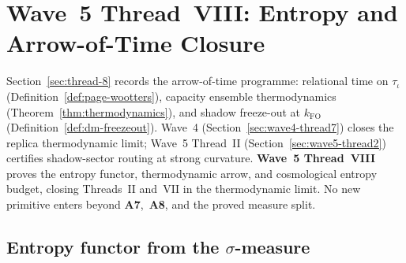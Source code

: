 \section{Wave~5 Thread~VIII: Entropy and Arrow-of-Time Closure}
\label{sec:wave5-thread8}

Section~\ref{sec:thread-8} records the arrow-of-time programme: relational time
on $\tau_\iota$ (Definition~\ref{def:page-wootters}), capacity ensemble
thermodynamics (Theorem~\ref{thm:thermodynamics}), and shadow freeze-out at
$k_{\mathrm{FO}}$ (Definition~\ref{def:dm-freezeout}). Wave~4
(Section~\ref{sec:wave4-thread7}) closes the replica thermodynamic limit;
Wave~5 Thread~II (Section~\ref{sec:wave5-thread2}) certifies shadow-sector
routing at strong curvature. \textbf{Wave~5 Thread~VIII} proves the entropy
functor, thermodynamic arrow, and cosmological entropy budget, closing Threads~II
and~VII in the thermodynamic limit. No new primitive enters beyond
\textbf{A7},~\textbf{A8}, and the proved measure split.

\subsection{Entropy functor from the $\sigma$-measure}
\label{sec:wave5-thread8:entropy}

